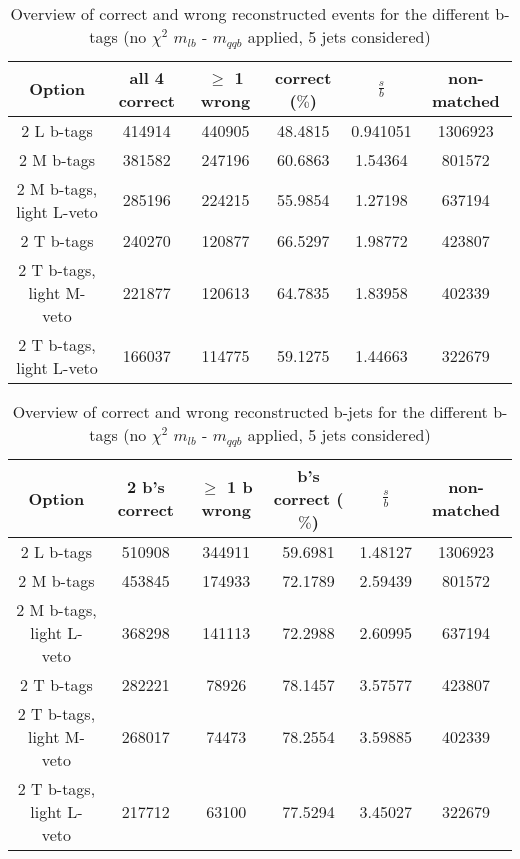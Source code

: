 \begin{table}[!h] 
 \begin{tabular}{c|c|c|c|c|c} 
  \textbf{Option} & all 4 correct & $\geq$ 1 wrong       & correct ($\%$)       & $\frac{s}{b}$ & non-matched \\ \hline 
  2 L b-tags              & 414914 & 440905 & 48.4815 & 0.941051 & 1306923\\ 
  2 M b-tags              & 381582 & 247196 & 60.6863 & 1.54364 & 801572\\ 
  2 M b-tags, light L-veto & 285196 & 224215 & 55.9854 & 1.27198 & 637194\\ 
  2 T b-tags              & 240270 & 120877 & 66.5297 & 1.98772 & 423807\\ 
  2 T b-tags, light M-veto & 221877 & 120613 & 64.7835 & 1.83958 & 402339\\ 
  2 T b-tags, light L-veto & 166037 & 114775 & 59.1275 & 1.44663 & 322679\\ 
 \end{tabular} 
 \caption{Overview of correct and wrong reconstructed events for the different b-tags (no $\chi^{2}$ $m_{lb}$ - $m_{qqb}$ applied, 5 jets considered)}
\end{table} 
 
\begin{table}[!h] 
 \begin{tabular}{c|c|c|c|c|c} 
  \textbf{Option} & 2 b's correct & $\geq$ 1 b wrong     & b's correct ($\%$)   & $\frac{s}{b}$ & non-matched \\ \hline 
  2 L b-tags              & 510908 & 344911 & 59.6981 & 1.48127 & 1306923\\ 
  2 M b-tags              & 453845 & 174933 & 72.1789 & 2.59439 & 801572\\ 
  2 M b-tags, light L-veto & 368298 & 141113 & 72.2988 & 2.60995 & 637194\\ 
  2 T b-tags              & 282221 & 78926 & 78.1457 & 3.57577 & 423807\\ 
  2 T b-tags, light M-veto & 268017 & 74473 & 78.2554 & 3.59885 & 402339\\ 
  2 T b-tags, light L-veto & 217712 & 63100 & 77.5294 & 3.45027 & 322679\\ 
 \end{tabular} 
 \caption{Overview of correct and wrong reconstructed b-jets for the different b-tags (no $\chi^{2}$ $m_{lb}$ - $m_{qqb}$ applied, 5 jets considered)}
\end{table} 
 
